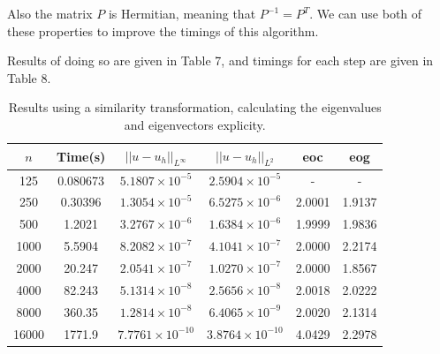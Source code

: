 \documentclass{article}
\numberwithin{equation}{section}
\begin{document}
Also the matrix $P$ is Hermitian, meaning that $P^{-1} = P^T$. We can use both of these properties to improve the timings of this algorithm.

Results of doing so are given in Table 7, and timings for each step are given in Table 8. 


\begin{table}[H]
\centering
\begin{tabular}{|c|c|c|c|c|c|}
\hline
$n$ & Time(s) & $|| u - u_h ||_{L^{\infty}}$ &$|| u - u_h ||_{L^{2}}$ & eoc & eog\\
\hline
125 & 0.080673 & $5.1807 \times 10^{-5}$ & $2.5904 \times 10^{-5}$ & - & -  \\
250 & 0.30396 & $1.3054 \times 10^{-5}$ & $6.5275 \times 10^{-6}$ & 2.0001 & 1.9137  \\
500 & 1.2021 & $3.2767 \times 10^{-6}$ & $1.6384 \times 10^{-6}$ & 1.9999 & 1.9836 \\
1000 & 5.5904 & $8.2082 \times 10^{-7}$ & $4.1041 \times 10^{-7}$ & 2.0000 & 2.2174  \\
2000 & 20.247 & $2.0541 \times 10^{-7}$ & $1.0270 \times 10^{-7}$ & 2.0000 & 1.8567 \\
4000 & 82.243 & $5.1314 \times 10^{-8}$ & $2.5656 \times 10^{-8}$ & 2.0018 & 2.0222  \\
8000 & 360.35 & $1.2814 \times 10^{-8}$ & $6.4065 \times 10^{-9}$ & 2.0020 & 2.1314  \\
16000 & 1771.9 & $7.7761 \times 10^{-10}$ & $3.8764 \times 10^{-10}$ & 4.0429 & 2.2978 \\
\hline
\end{tabular}
\captionsetup{justification=centering}
\caption{Results using a similarity transformation, calculating the eigenvalues and eigenvectors explicity.}
\end{table}
\end{document}
